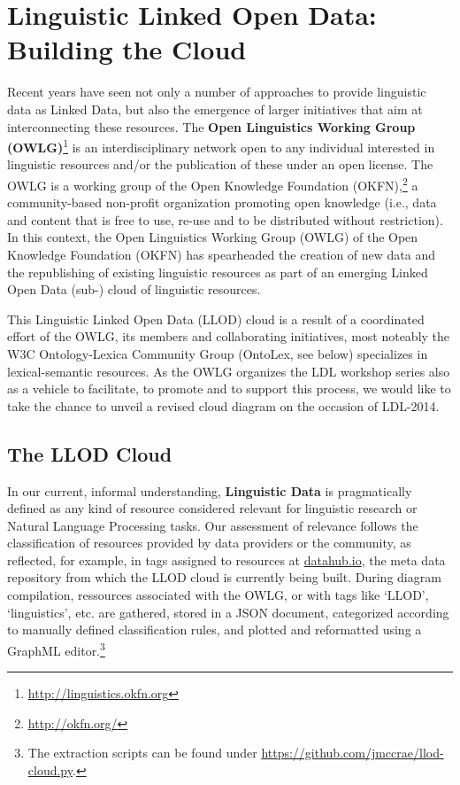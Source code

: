 \section{Linguistic Linked Open Data: Building the Cloud}

Recent years have seen not only a number of approaches to provide linguistic data as Linked Data, but also the emergence of larger initiatives that aim at interconnecting these resources.
The \textbf{Open Linguistics Working Group (OWLG)}\footnote{\url{http://linguistics.okfn.org}} is an interdisciplinary network open to any individual interested in linguistic resources and/or the publication of these under an open license. The OWLG is a working group of the Open Knowledge Foundation (OKFN),\footnote{\url{http://okfn.org/}} a community-based non-profit organization promoting open knowledge (i.e., data and content that is free to use, re-use and to be distributed without restriction).
In this context, the Open Linguistics Working Group (OWLG) of the Open Knowledge Foundation (OKFN) has spearheaded the creation of 
new data and the republishing of existing linguistic resources as part of an emerging Linked Open Data (sub-) cloud of linguistic resources. 

This Linguistic Linked Open Data (LLOD) cloud is a result of a coordinated effort of the OWLG, its members and collaborating initiatives, most noteably the W3C Ontology-Lexica Community Group (OntoLex, see below) specializes in lexical-semantic resources.
As the OWLG organizes the LDL workshop series also as a vehicle to facilitate, to promote and to support this process, we would like to take the chance to unveil a revised cloud diagram on the occasion of LDL-2014.

\subsection{The LLOD Cloud}

In our current, informal understanding, \textbf{Linguistic Data} is pragmatically defined as any kind of resource considered relevant for linguistic research or Natural Language Processing tasks. 
Our assessment of relevance follows the classification of resources provided by data providers or the community, as reflected, for example, in tags assigned to resources at \url{datahub.io}, the meta data repository from which the LLOD cloud is currently being built. During diagram compilation, ressources associated with the OWLG, or with tags like `LLOD', `linguistics', etc. are gathered, stored in a JSON document, categorized according to manually defined classification rules, and plotted and reformatted using a GraphML editor.\footnote{
	The extraction scripts can be found under \url{https://github.com/jmccrae/llod-cloud.py}.
}

